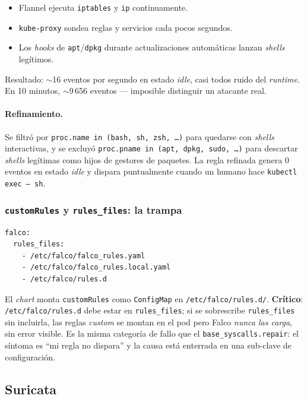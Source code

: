\begin{itemize}
  \item Flannel ejecuta \texttt{iptables} y \texttt{ip} continuamente.
  \item \texttt{kube-proxy} sondea reglas y servicios cada pocos segundos.
  \item Los \emph{hooks} de \texttt{apt}/\texttt{dpkg} durante actualizaciones automáticas lanzan \emph{shells} legítimos.
\end{itemize}

Resultado: $\sim$16 eventos por segundo en estado \emph{idle}, casi todos ruido del \emph{runtime}. En 10 minutos, $\sim$9\,656 eventos --- imposible distinguir un atacante real.

\paragraph{Refinamiento.} Se filtró por \texttt{proc.name in (bash, sh, zsh, \dots)} para quedarse con \emph{shells} interactivas, y se excluyó \texttt{proc.pname in (apt, dpkg, sudo, \dots)} para descartar \emph{shells} legítimas como hijos de gestores de paquetes. La regla refinada genera 0 eventos en estado \emph{idle} y dispara puntualmente cuando un humano hace \texttt{kubectl exec -- sh}.

\subsubsection{\texttt{customRules} y \texttt{rules\_files}: la trampa}

\begin{lstlisting}[style=yaml]
falco:
  rules_files:
    - /etc/falco/falco_rules.yaml
    - /etc/falco/falco_rules.local.yaml
    - /etc/falco/rules.d
\end{lstlisting}

El \emph{chart} monta \texttt{customRules} como \texttt{ConfigMap} en \texttt{/etc/falco/rules.d/}. \textbf{Crítico}: \texttt{/etc/falco/rules.d} debe estar en \texttt{rules\_files}; si se sobrescribe \texttt{rules\_files} sin incluirla, las reglas \emph{custom} se montan en el pod pero Falco \emph{nunca las carga}, sin error visible. Es la misma categoría de fallo que el \texttt{base\_syscalls.repair}: el síntoma es ``mi regla no dispara'' y la causa está enterrada en una sub-clave de configuración.

\subsection{Suricata}

